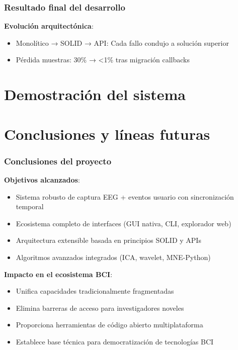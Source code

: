 \documentclass[10pt,thmsa]{beamer}
\theoremstyle{plain}
\begin{document}
\begin{frame}
\frametitle{Resultado final del desarrollo}

\textbf{Evolución arquitectónica}:
\begin{itemize}
\item Monolítico → SOLID → API: Cada fallo condujo a solución superior
\item Pérdida muestras: 30\% → <1\% tras migración callbacks
\end{itemize}

\end{frame}

\section{Demostración del sistema}


\section{Conclusiones y líneas futuras}

\begin{frame}
\frametitle{Conclusiones del proyecto}

\textbf{Objetivos alcanzados}:
\begin{itemize}
\item Sistema robusto de captura EEG + eventos usuario con sincronización temporal
\item Ecosistema completo de interfaces (GUI nativa, CLI, explorador web)
\item Arquitectura extensible basada en principios SOLID y APIs
\item Algoritmos avanzados integrados (ICA, wavelet, MNE-Python)
\end{itemize}

\vspace{1em}

\textbf{Impacto en el ecosistema BCI}:
\begin{itemize}
\item Unifica capacidades tradicionalmente fragmentadas
\item Elimina barreras de acceso para investigadores noveles
\item Proporciona herramientas de código abierto multiplataforma
\item Establece base técnica para democratización de tecnologías BCI
\end{itemize}
\end{frame}
\end{document}

